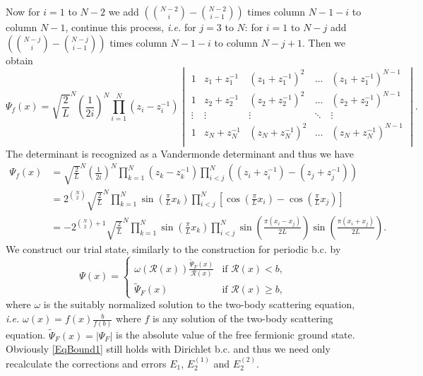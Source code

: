 \documentclass[a4paper,11pt]{article}
\newcommand{\abs}[1]{\left\lvert #1 \right\rvert}
\newcommand{\ie}{\emph{i.e.} }
\newcommand{\rr}{\mathcal{R}}
\numberwithin{equation}{section}
\begin{document}
	Now for $ i=1 $ to $ N-2 $ we add $ \left(\binom{N-2}{i}-\binom{N-2}{i-1}\right) $ times column $ N-1-i $ to column $ N-1 $, continue this process, \ie for $ j=3 $ to $ N $: for $ i=1 $ to $ N-j $ add  $ \left(\binom{N-j}{i}-\binom{N-j}{i-1}\right) $ times column $ N-1-i $ to column $ N-j+1 $. Then we obtain \begin{equation}
	\Psi_f(x)=\sqrt{\frac{2}{L}}^N\left(\frac{1}{2i}\right)^N\prod_{i=1}^{N}(z_i-z_i^{-1})\begin{vmatrix}
	1&z_1+z_1^{-1}&(z_1+z_1^{-1})^2&\ldots&(z_1+z_1^{-1})^{N-1}\\
	1&z_2+z_2^{-1}&(z_2+z_2^{-1})^2&\ldots&(z_2+z_2^{-1})^{N-1}\\
	\vdots&\vdots&\vdots&\ddots&\vdots\\
	1&z_N+z_N^{-1}&(z_N+z_N^{-1})^2&\ldots&(z_N+z_N^{-1})^{N-1}\\
	\end{vmatrix}.
	\end{equation}
	The determinant is recognized as a Vandermonde determinant and thus we have \begin{equation}
	\begin{aligned}
	\Psi_f(x)&=\sqrt{\frac{2}{L}}^N\left(\frac{1}{2i}\right)^N\prod_{k=1}^{N}(z_k-z_k^{-1})\prod_{i<j}^{N}\left((z_i+z_i^{-1})-(z_j+z_j^{-1})\right)\\
	&=2^{\binom{N}{2}}\sqrt{\frac{2}{L}}^N\prod_{k=1}^{N}\sin\left(\frac{\pi}{L}x_k\right)\prod_{i<j}^{N}\left[\cos\left(\frac{\pi}{L}x_i\right)-\cos\left(\frac{\pi}{L}x_j\right)\right]\\
	&=-2^{\binom{N}{2}+1}\sqrt{\frac{2}{L}}^N\prod_{k=1}^{N}\sin\left(\frac{\pi}{L}x_k\right)\prod_{i<j}^{N}\sin\left(\frac{\pi(x_i-x_j)}{2L}\right)\sin\left(\frac{\pi(x_i+x_j)}{2L}\right)
	.
	\end{aligned}
	\end{equation}
	We construct our trial state, similarly to the construction for periodic b.c. by 
	\begin{equation}
	\Psi(x)=\begin{cases}
	\omega(\rr(x))\frac{\tilde{\Psi}_F(x)}{\rr(x)}& \text{if }\rr(x)<b,\\
	\tilde{\Psi}_F(x)&\text{if }\rr(x)\geq b,
	\end{cases}
	\end{equation}
	where $ \omega $ is the suitably normalized solution to the two-body scattering equation, \ie $ \omega(x)=f(x)\frac{b}{f(b)} $ where $ f $ is any solution of the two-body scattering equation.  $ \tilde{\Psi}_F(x)=\abs{\Psi_F} $ is the absolute value of the free fermionic ground state. Obviously \eqref{EqBound1} still holds with Dirichlet b.c. and thus we need only recalculate the corrections and errors $ E_1 $, $ E_2^{(1)} $ and $ E^{(2)}_2 $.
\end{document}
